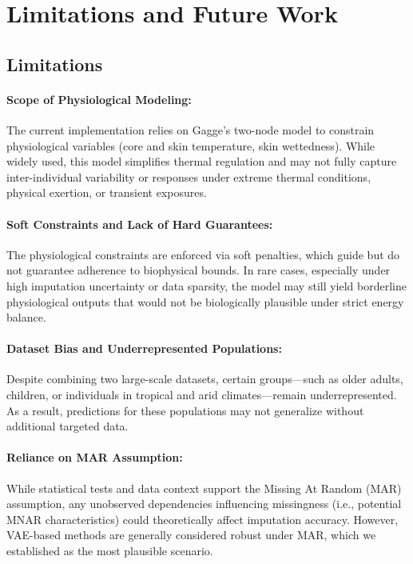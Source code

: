 \section{Limitations and Future Work}

\subsection{Limitations}

\paragraph{Scope of Physiological Modeling:} The current implementation relies on Gagge’s two-node model to constrain physiological variables (core and skin temperature, skin wettedness). While widely used, this model simplifies thermal regulation and may not fully capture inter-individual variability or responses under extreme thermal conditions, physical exertion, or transient exposures.

\paragraph{Soft Constraints and Lack of Hard Guarantees:} The physiological constraints are enforced via soft penalties, which guide but do not guarantee adherence to biophysical bounds. In rare cases, especially under high imputation uncertainty or data sparsity, the model may still yield borderline physiological outputs that would not be biologically plausible under strict energy balance.

\paragraph{Dataset Bias and Underrepresented Populations:} Despite combining two large-scale datasets, certain groups—such as older adults, children, or individuals in tropical and arid climates—remain underrepresented. As a result, predictions for these populations may not generalize without additional targeted data.

\paragraph{Reliance on MAR Assumption:} While statistical tests and data context support the Missing At Random (MAR) assumption, any unobserved dependencies influencing missingness (i.e., potential MNAR characteristics) could theoretically affect imputation accuracy. However, VAE-based methods are generally considered robust under MAR, which we established as the most plausible scenario.

